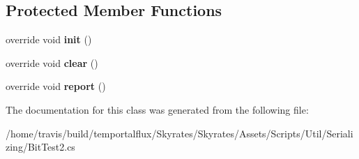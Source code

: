 \subsection*{Protected Member Functions}
\begin{DoxyCompactItemize}
\item 
\hypertarget{class_skyrates_1_1_util_1_1_serializing_1_1_test_1_1_bit_test2_ac6b3c829bbc09ddc4abd46d37f38805c}{override void {\bfseries init} ()}\label{class_skyrates_1_1_util_1_1_serializing_1_1_test_1_1_bit_test2_ac6b3c829bbc09ddc4abd46d37f38805c}

\item 
\hypertarget{class_skyrates_1_1_util_1_1_serializing_1_1_test_1_1_bit_test2_a69bbb2c117b3f3ce583a3f76de49cd06}{override void {\bfseries clear} ()}\label{class_skyrates_1_1_util_1_1_serializing_1_1_test_1_1_bit_test2_a69bbb2c117b3f3ce583a3f76de49cd06}

\item 
\hypertarget{class_skyrates_1_1_util_1_1_serializing_1_1_test_1_1_bit_test2_a3d3156f4018f08f6ff7133d823d6bf3a}{override void {\bfseries report} ()}\label{class_skyrates_1_1_util_1_1_serializing_1_1_test_1_1_bit_test2_a3d3156f4018f08f6ff7133d823d6bf3a}

\end{DoxyCompactItemize}


The documentation for this class was generated from the following file\-:\begin{DoxyCompactItemize}
\item 
/home/travis/build/temportalflux/\-Skyrates/\-Skyrates/\-Assets/\-Scripts/\-Util/\-Serializing/Bit\-Test2.\-cs\end{DoxyCompactItemize}
